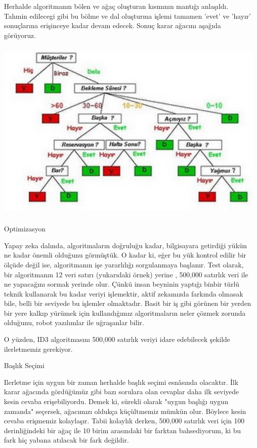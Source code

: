 \documentclass[12pt,fleqn]{article}\usepackage{../../common}
\begin{document}
Herhalde algoritmanın bölen ve ağaç oluşturan kısmının mantığı
anlaşıldı. Tahmin edilecegi gibi bu bölme ve dal oluşturma işlemi tamamen
'evet' ve 'hayır' sonuçlarına erişinceye kadar devam edecek. Sonuç karar
ağacını aşağıda görüyoruz.

\includegraphics[height=9cm]{id3_agac_ilk.jpg}

Optimizasyon

Yapay zeka dalında, algoritmaların doğruluğu kadar, bilgisayara getirdiği
yükün ne kadar önemli olduğunu görmüştük. O kadar ki, eğer bu yük kontrol
edilir bir ölçüde değil ise, algoritmanın işe yararlılığı sorgulanmaya
başlanır. Test olarak, bir algoritmanın 12 veri satırı (yukarıdaki örnek)
yerine , 500,000 satırlık veri ile ne yapacağını sormak yerinde olur. Çünkü
insan beyninin yaptığı binbir türlü teknik kullanarak bu kadar veriyi
işlemektir, aktif zekamızda farkında olmasak bile, belli bir seviyede bu
işlemler olmaktadır. Basit bir iş gibi görünen bir yerden bir yere kalkıp
yürümek için kullandığımız algoritmaların neler çözmek zorunda olduğunu,
robot yazılımlar ile uğraşanlar bilir.

O yüzden, ID3 algoritmasını 500,000 satırlık veriyi idare edebilecek
şekilde ilerletmemiz gerekiyor.

Başlık Seçimi

Ilerletme için uygun bir zaman herhalde başlık seçimi esnâsında
olacaktır. İlk karar ağacında gördüğümüz gibi bazı sorulara olan cevaplar
daha ilk seviyede kesin cevaba erişebiliyordu. Demek ki, sürekli olarak
"uygun başlığı uygun zamanda" seçersek, ağacımızı oldukça küçültmemiz
mümkün olur. Böylece kesin cevaba erişmemiz kolaylaşır. Tabii kolaylık
derken, 500,000 satırlık veri için 100 derinliğindeki bir ağaç ile 10 birim
arasındaki bir farktan bahsediyorum, ki bu fark hiç yabana atılacak bir
fark değildir.
\end{document}
